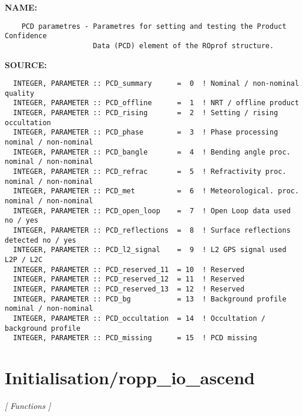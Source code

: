 \label{ch:robo65}
\label{ch:Initialisation_PCD_parametres}
\textbf{NAME:}\hspace{0.08in}\begin{Verbatim}
    PCD parametres - Parametres for setting and testing the Product Confidence
                     Data (PCD) element of the ROprof structure.
\end{Verbatim}
\textbf{SOURCE:}\hspace{0.08in}\begin{Verbatim}
  INTEGER, PARAMETER :: PCD_summary      =  0  ! Nominal / non-nominal quality
  INTEGER, PARAMETER :: PCD_offline      =  1  ! NRT / offline product
  INTEGER, PARAMETER :: PCD_rising       =  2  ! Setting / rising occultation
  INTEGER, PARAMETER :: PCD_phase        =  3  ! Phase processing      nominal / non-nominal
  INTEGER, PARAMETER :: PCD_bangle       =  4  ! Bending angle proc.   nominal / non-nominal
  INTEGER, PARAMETER :: PCD_refrac       =  5  ! Refractivity proc.    nominal / non-nominal
  INTEGER, PARAMETER :: PCD_met          =  6  ! Meteorological. proc. nominal / non-nominal
  INTEGER, PARAMETER :: PCD_open_loop    =  7  ! Open Loop data used   no / yes
  INTEGER, PARAMETER :: PCD_reflections  =  8  ! Surface reflections detected no / yes
  INTEGER, PARAMETER :: PCD_l2_signal    =  9  ! L2 GPS signal used    L2P / L2C
  INTEGER, PARAMETER :: PCD_reserved_11  = 10  ! Reserved
  INTEGER, PARAMETER :: PCD_reserved_12  = 11  ! Reserved
  INTEGER, PARAMETER :: PCD_reserved_13  = 12  ! Reserved
  INTEGER, PARAMETER :: PCD_bg           = 13  ! Background profile nominal / non-nominal
  INTEGER, PARAMETER :: PCD_occultation  = 14  ! Occultation / background profile
  INTEGER, PARAMETER :: PCD_missing      = 15  ! PCD missing
\end{Verbatim}
\section{Initialisation/ropp\_io\_ascend}
\textsl{[ Functions ]}

